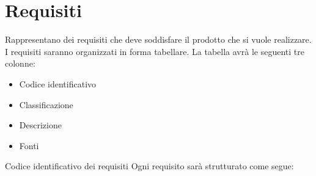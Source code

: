 \renewcommand{\o}{Obbligatorio}
\renewcommand{\d}{Desiderabile}
\newcommand{\op}{Opzionale}
\section{Requisiti}
    Rappresentano dei requisiti che deve soddisfare il prodotto che si vuole realizzare.
    I requisiti saranno organizzati in forma tabellare.
    La tabella avrà le seguenti tre colonne:
    \begin{itemize}
        \item Codice identificativo
        \item Classificazione
        \item Descrizione
        \item Fonti
    \end{itemize}
    Codice identificativo dei requisiti
    Ogni requisito sarà strutturato come segue:
